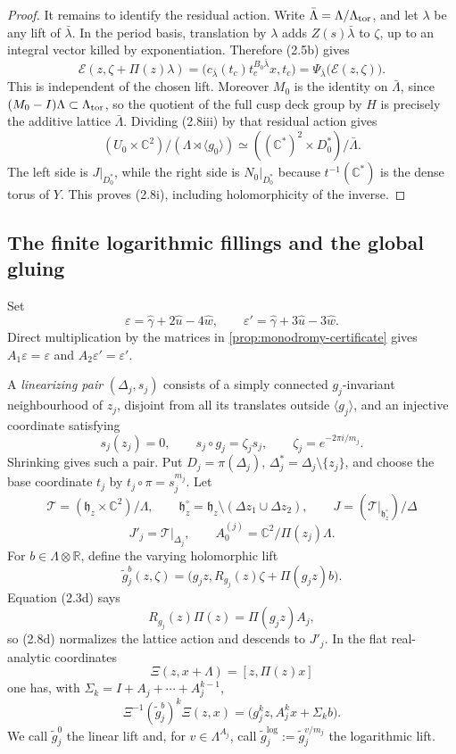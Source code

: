 \begin{proof}
It remains to identify the residual action.  Write
\(\bar\Lambda=\Lambda/\Lambda_{\rm tor}\), and let \(\lambda\) be any lift
of \(\bar\lambda\).  In the period basis, translation by \(\lambda\) adds
\(Z(s)\bar\lambda\) to \(\zeta\), up to an integral vector killed by
exponentiation.  Therefore (2.5b) gives
\[
 \mathcal E(z,\zeta+\Pi(z)\lambda)
 =\bigl(c_{\bar\lambda}(t_c)t_c^{B_0\bar\lambda}x,t_c\bigr)
 =\Psi_{\bar\lambda}\bigl(\mathcal E(z,\zeta)\bigr).
\tag{2.8iii}
\]
This is independent of the chosen lift.  Moreover \(M_0\) is the identity
on \(\bar\Lambda\), since \((M_0-I)\Lambda\subset\Lambda_{\rm tor}\), so
the quotient of the full cusp deck group by \(H\) is precisely the additive
lattice \(\bar\Lambda\).  Dividing (2.8iii) by that residual action gives
\[
 (U_0\times\mathbb C^2)/(\Lambda\rtimes\langle g_0\rangle)
 \simeq
 ((\mathbb C^*)^2\times D_0^*)/\bar\Lambda.
\]
The left side is \(J|_{D_0^*}\), while the right side is
\(N_0|_{D_0^*}\) because \(t^{-1}(\mathbb C^*)\) is the dense torus of
\(Y\).  This proves (2.8i), including holomorphicity of the inverse.
\end{proof}

\subsection{The finite logarithmic fillings and the global gluing}

Set
\[
 \varepsilon=\widehat\gamma+2\widehat u-4\widehat w,
 \qquad
 \varepsilon'=\widehat\gamma+3\widehat u-3\widehat w.
 \tag{2.8a}
\]
Direct multiplication by the matrices in
\cref{prop:monodromy-certificate} gives
\(A_1\varepsilon=\varepsilon\) and
\(A_2\varepsilon'=\varepsilon'\).

A \emph{linearizing pair} \((\Delta_j,s_j)\) consists of a simply connected
\(g_j\)-invariant neighbourhood of \(z_j\), disjoint from all its translates
outside \(\langle g_j\rangle\), and an injective coordinate satisfying
\[
 s_j(z_j)=0,\qquad s_j\circ g_j=\zeta_js_j,
 \qquad \zeta_j=e^{-2\pi i/m_j}.
 \tag{2.8b}
\]
Shrinking gives such a pair.  Put \(D_j=\pi(\Delta_j)\),
\(\Delta_j^*=\Delta_j\setminus\{z_j\}\), and choose the base coordinate
\(t_j\) by \(t_j\circ\pi=s_j^{m_j}\).  Let
\[
 \mathcal T=(\mathfrak h_z\times\mathbb C^2)/\Lambda,
 \qquad
 \mathfrak h_z^\circ=\mathfrak h_z\setminus
 (\Delta z_1\cup\Delta z_2),
 \qquad
 J=(\mathcal T|_{\mathfrak h_z^\circ})/\Delta
 \]
\[
 J'_j=\mathcal T|_{\Delta_j},
 \qquad
 A_0^{(j)}=\mathbb C^2/\Pi(z_j)\Lambda.
 \tag{2.8c}
\]
For \(b\in\Lambda\otimes\mathbb R\), define the varying holomorphic lift
\[
 \widetilde g_j^{b}(z,\zeta)=
 \bigl(g_jz,R_{g_j}(z)\zeta+\Pi(g_jz)b\bigr).
 \tag{2.8d}
\]
Equation (2.3d) says
\[
 R_{g_j}(z)\Pi(z)=\Pi(g_jz)A_j,
 \tag{2.8e}
\]
so (2.8d) normalizes the lattice action and descends to \(J'_j\).  In the
flat real-analytic coordinates
\[
 \Xi(z,x+\Lambda)=[z,\Pi(z)x]
\]
one has, with \(\Sigma_k=I+A_j+\cdots+A_j^{k-1}\),
\[
 \Xi^{-1}(\widetilde g_j^{b})^k\Xi(z,x)
 =\bigl(g_j^kz,A_j^kx+\Sigma_kb\bigr).
 \tag{2.8f}
\]
We call \(\widetilde g_j^{0}\) the linear lift and, for
\(v\in\Lambda^{A_j}\), call
\(\widetilde g_j^{\log}:=\widetilde g_j^{v/m_j}\) the logarithmic lift.

